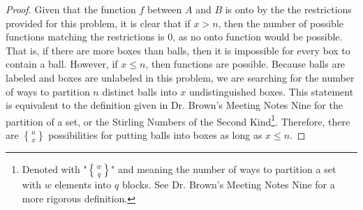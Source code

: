 \documentclass[12pt]{article}
\newcommand{\stirling}[2]{\genfrac{\{}{\}}{0pt}{}{#1}{#2}}
\newenvironment{problem}[2][Problem]{\begin{trivlist}
\item[\hskip \labelsep {\bfseries #1}\hskip \labelsep {\bfseries #2.}]}{\end{trivlist}}
\begin{document}
\begin{problem}{9}
\end{problem}
\begin{proof}
Given that the function $f$ between $A$ and $B$ is onto by the the restrictions provided for this problem, it is clear that if $x > n$, then the number of possible functions matching the restrictions is 0, as no onto function would be possible. That is, if there are more boxes than balls, then it is impossible for every box to contain a ball. However, if $x \leq n$, then functions are possible. Because balls are labeled and boxes are unlabeled in this problem, we are searching for the number of ways to partition $n$ distinct balls into $x$ undistinguished boxes. This statement is equivalent to the definition given in Dr. Brown's Meeting Notes Nine for the partition of a set, or the Stirling Numbers of the Second Kind\footnote{Denoted with "$\stirling{w}{q}$" and meaning the number of ways to partition a set with $w$ elements into $q$ blocks. See Dr. Brown's Meeting Notes Nine for a more rigorous definition.}. Therefore, there are $\stirling{n}{x}$ possibilities for putting balls into boxes as long as $x \leq n$. 
\end{proof}
\end{document}
